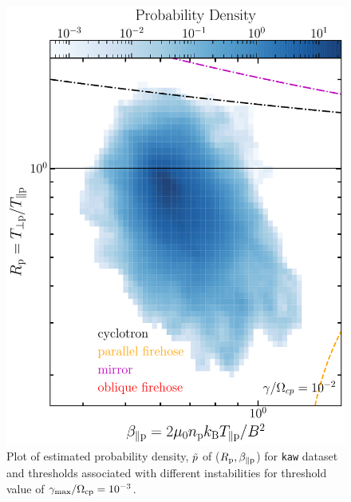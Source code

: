     \begin{figure}
        \begin{center}
            \includegraphics[width=1\textwidth]{figures/apdxA/brazil_prob_2dpp.pdf}
            \caption[Brazil-plot of \texttt{kaw} dataset]{Plot of estimated probability density,
            $\Tilde{p}$ of ($R_{\rm p}, \beta_{\parallel \rm p}$) for \texttt{kaw} dataset and
            thresholds associated with different instabilities for threshold value of
            $\gamma_{\max}/\Omega_{\rm cp} = 10^{-3}$.}
            \label{fig:brazil_prob_2dpp}
        \end{center}
    \end{figure}

